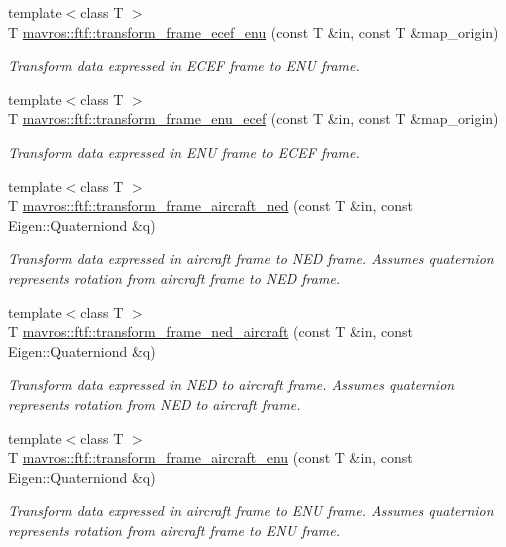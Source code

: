 \begin{DoxyCompactItemize}
{\footnotesize template$<$class T $>$ }\\T \mbox{\hyperlink{group__nodelib_gaa1d1407cbddfd1481e147680e92acab8}{mavros\+::ftf\+::transform\+\_\+frame\+\_\+ecef\+\_\+enu}} (const T \&in, const T \&map\+\_\+origin)
\begin{DoxyCompactList}\small\item\em Transform data expressed in E\+C\+EF frame to E\+NU frame. \end{DoxyCompactList}\item 
{\footnotesize template$<$class T $>$ }\\T \mbox{\hyperlink{group__nodelib_ga8f46c9063053398c558624755757f1e2}{mavros\+::ftf\+::transform\+\_\+frame\+\_\+enu\+\_\+ecef}} (const T \&in, const T \&map\+\_\+origin)
\begin{DoxyCompactList}\small\item\em Transform data expressed in E\+NU frame to E\+C\+EF frame. \end{DoxyCompactList}\item 
{\footnotesize template$<$class T $>$ }\\T \mbox{\hyperlink{group__nodelib_gaabef5de6c7b391794c35c75dd1232194}{mavros\+::ftf\+::transform\+\_\+frame\+\_\+aircraft\+\_\+ned}} (const T \&in, const Eigen\+::\+Quaterniond \&q)
\begin{DoxyCompactList}\small\item\em Transform data expressed in aircraft frame to N\+ED frame. Assumes quaternion represents rotation from aircraft frame to N\+ED frame. \end{DoxyCompactList}\item 
{\footnotesize template$<$class T $>$ }\\T \mbox{\hyperlink{group__nodelib_ga916fb57c10ef6a7109585245f512d4b2}{mavros\+::ftf\+::transform\+\_\+frame\+\_\+ned\+\_\+aircraft}} (const T \&in, const Eigen\+::\+Quaterniond \&q)
\begin{DoxyCompactList}\small\item\em Transform data expressed in N\+ED to aircraft frame. Assumes quaternion represents rotation from N\+ED to aircraft frame. \end{DoxyCompactList}\item 
{\footnotesize template$<$class T $>$ }\\T \mbox{\hyperlink{group__nodelib_ga501a41c3a2de7186f4ed602a0399a75b}{mavros\+::ftf\+::transform\+\_\+frame\+\_\+aircraft\+\_\+enu}} (const T \&in, const Eigen\+::\+Quaterniond \&q)
\begin{DoxyCompactList}\small\item\em Transform data expressed in aircraft frame to E\+NU frame. Assumes quaternion represents rotation from aircraft frame to E\+NU frame. \end{DoxyCompactList}\item 

\end{DoxyCompactItemize}
